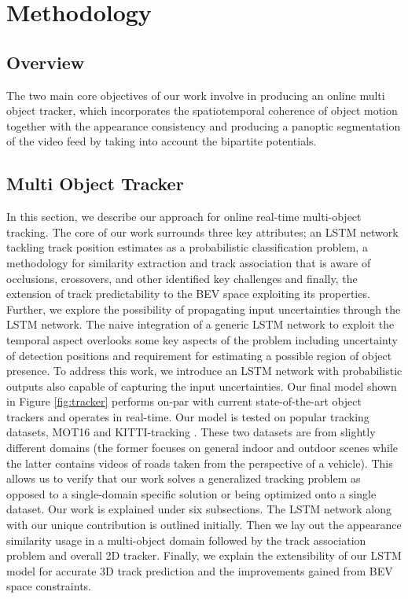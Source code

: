 \chapter{Methodology}

\section{Overview}
The two main core objectives of our work involve in producing an online multi object tracker, which incorporates the spatiotemporal coherence of object motion together with the appearance consistency and producing a panoptic segmentation of the video feed by taking into account the bipartite potentials.

\section{Multi Object Tracker}

In this section, we describe our approach for online real-time multi-object tracking. The core of our work surrounds three key attributes; an LSTM network tackling track position estimates as a probabilistic classification problem, a methodology for similarity extraction and track association that is aware of occlusions, crossovers, and other identified key challenges and finally, the extension of track predictability to the BEV space exploiting its properties. Further, we explore the possibility of propagating input uncertainties through the LSTM network. The naive integration of a generic LSTM network to exploit the temporal aspect overlooks some key aspects of the problem including uncertainty of detection positions and requirement for estimating a possible region of object presence. To address this work, we introduce an LSTM network with probabilistic outputs also capable of capturing the input uncertainties. Our final model shown in Figure \ref{fig:tracker} performs on-par with current state-of-the-art object trackers and operates in real-time. Our model is tested on popular tracking datasets, MOT16 \cite{DeepSiam:MilanL0RS16} and KITTI-tracking \cite{DeepSiam:KITTI}. These two datasets are from slightly different domains (the former focuses on general indoor and outdoor scenes while the latter contains videos of roads taken from the perspective of a vehicle). This allows us to verify that our work solves a generalized tracking problem as opposed to a single-domain specific solution or being optimized onto a single dataset. Our work is explained under six subsections. The LSTM network along with our unique contribution is outlined initially. Then we lay out the appearance similarity usage in a multi-object domain followed by the track association problem and overall 2D tracker. Finally, we explain the extensibility of our LSTM model for accurate 3D track prediction and the improvements gained from BEV space constraints.


